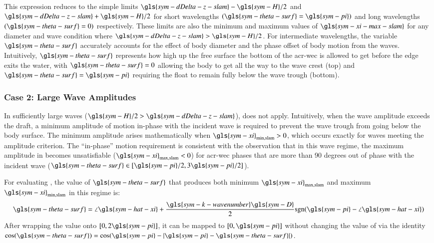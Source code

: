 This expression reduces to the simple limits $\gls{sym-dDelta-z-slam} -\gls{sym-H}/2$ and $\gls{sym-dDelta-z-slam} +\gls{sym-H}/2$
for short wavelengths $(\gls{sym-theta-surf}=\gls{sym-pi})$ and long wavelengths $(\gls{sym-theta-surf}=0)$ respectively.
These limits are also the minimum and maximum values of $\gls{sym-xi-max-slam}$ for any diameter and wave condition where $\gls{sym-dDelta-z-slam} >\gls{sym-H}/2$.
For intermediate wavelengths, the variable $\gls{sym-theta-surf}$ accurately accounts for the effect of body diameter and the phase offset of body motion from the waves.
Intuitively, $\gls{sym-theta-surf}$ represents how high up the free surface the bottom of the \gls{acr-wec} is allowed to get before the edge exits the water,
with $\gls{sym-theta-surf}=0$ allowing the body to get all the way to the wave crest (top)
and $\gls{sym-theta-surf}=\gls{sym-pi}$ requiring the float to remain fully below the wave trough (bottom).

\subsubsection{Case 2: Large Wave Amplitudes}
In sufficiently large waves ($\gls{sym-H}/2>\gls{sym-dDelta-z-slam}$),  does not apply.
Intuitively, when the wave amplitude exceeds the draft, a minimum amplitude of motion in-phase with the incident wave is required to prevent the wave trough from going below the body surface.
The minimum amplitude arises mathematically when $\gls{sym-xi}_{\text{min},\text{slam}}>0$, which occurs exactly for waves meeting the amplitude criterion.
The ``in-phase'' motion requirement is consistent with the observation that in this wave regime, the maximum amplitude in  becomes unsatisfiable ($\gls{sym-xi}_{\text{max},\text{slam}}<0$) for \gls{acr-wec} phases that are more than 90 degrees out of phase with the incident wave ($\gls{sym-theta-surf} \in [\gls{sym-pi}/2,3\gls{sym-pi}/2]$).

For evaluating , the value of $\gls{sym-theta-surf}$ that produces both minimum $\gls{sym-xi}_{\text{max},\text{slam}}$ and maximum $\gls{sym-xi}_{\text{min},\text{slam}}$ in this regime is:
\begin{equation}
\gls{sym-theta-surf} = \angle\gls{sym-hat-xi} + \frac{\gls{sym-k-wavenumber}\gls{sym-D}}{2}\textrm{sgn}(\gls{sym-pi}-\angle\gls{sym-hat-xi})
\end{equation}
After wrapping the value onto $[0,2\gls{sym-pi}]$, it can be mapped to $[0,\gls{sym-pi}]$ without changing the value of  via the identity $\cos(\gls{sym-theta-surf})=\cos(\gls{sym-pi}-|\gls{sym-pi}-\gls{sym-theta-surf}|)$.

